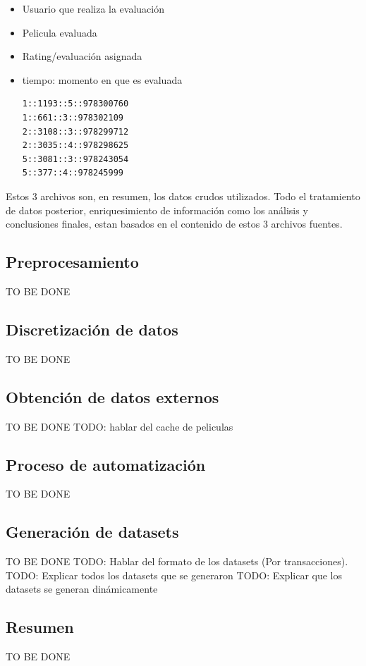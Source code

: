 \documentclass[journal]{IEEEtran}
\begin{document}
\begin{itemize}
		\begin{itemize}
			\item Usuario que realiza la evaluación
			\item Pelicula evaluada
			\item Rating/evaluación asignada
			\item tiempo: momento en que es evaluada

        \begin{lstlisting}[frame=single]
1::1193::5::978300760
1::661::3::978302109
2::3108::3::978299712
2::3035::4::978298625
5::3081::3::978243054
5::377::4::978245999
        \end{lstlisting}
    \end{itemize}

\end{itemize}

Estos 3 archivos son, en resumen, los datos crudos utilizados. 
Todo el tratamiento de datos posterior, enriquesimiento de información como los
análisis y conclusiones finales, estan basados en el contenido de estos 3 archivos
fuentes.

\subsection{Preprocesamiento}
TO BE DONE
\subsection{Discretización de datos}
TO BE DONE
\subsection{Obtención de datos externos}
TO BE DONE
TODO: hablar del cache de peliculas
\subsection{Proceso de automatización}
TO BE DONE
\subsection{Generación de datasets}
TO BE DONE
TODO: Hablar del formato de los datasets (Por transacciones). 
TODO: Explicar todos los datasets que se generaron
TODO: Explicar que los datasets se generan dinámicamente
\subsection{Resumen}
TO BE DONE
\end{document}
